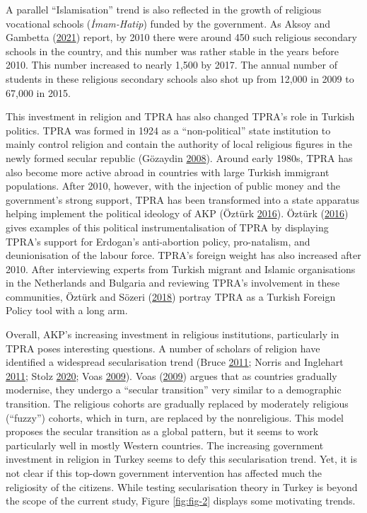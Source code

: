 \documentclass[
  12pt,
]{article}
\begin{document}
A parallel ``Islamisation'' trend is also reflected in the growth of religious vocational schools (\emph{İmam-Hatip}) funded by the government. As Aksoy and Gambetta (\protect\hyperlink{ref-AG21}{2021}) report, by 2010 there were around 450 such religious secondary schools in the country, and this number was rather stable in the years before 2010. This number increased to nearly 1,500 by 2017. The annual number of students in these religious secondary schools also shot up from 12,000 in 2009 to 67,000 in 2015.

This investment in religion and TPRA has also changed TPRA's role in Turkish politics. TPRA was formed in 1924 as a ``non-political'' state institution to mainly control religion and contain the authority of local religious figures in the newly formed secular republic (Gözaydin \protect\hyperlink{ref-Guxf6zaydin2008}{2008}). Around early 1980s, TPRA has also become more active abroad in countries with large Turkish immigrant populations. After 2010, however, with the injection of public money and the government's strong support, TPRA has been transformed into a state apparatus helping implement the political ideology of AKP (Öztürk \protect\hyperlink{ref-Ozt16}{2016}). Öztürk (\protect\hyperlink{ref-Ozt16}{2016}) gives examples of this political instrumentalisation of TPRA by displaying TPRA's support for Erdogan's anti-abortion policy, pro-natalism, and deunionisation of the labour force. TPRA's foreign weight has also increased after 2010. After interviewing experts from Turkish migrant and Islamic organisations in the Netherlands and Bulgaria and reviewing TPRA's involvement in these communities, Öztürk and Sözeri (\protect\hyperlink{ref-uxf6ztuxfcrk_suxf6zeri_2018}{2018}) portray TPRA as a Turkish Foreign Policy tool with a long arm.

Overall, AKP's increasing investment in religious institutions, particularly in TPRA poses interesting questions. A number of scholars of religion have identified a widespread secularisation trend (Bruce \protect\hyperlink{ref-bruce2011sec}{2011}; Norris and Inglehart \protect\hyperlink{ref-norris2011sacred}{2011}; Stolz \protect\hyperlink{ref-Sto20}{2020}; Voas \protect\hyperlink{ref-voas2009rise}{2009}). Voas (\protect\hyperlink{ref-voas2009rise}{2009}) argues that as countries gradually modernise, they undergo a ``secular transition''
very similar to a demographic transition. The religious cohorts are gradually replaced by moderately religious (``fuzzy'') cohorts, which in turn, are replaced by the nonreligious. This model proposes the secular transition as a global pattern, but it seems to work particularly well in mostly Western countries. The increasing government investment in religion in Turkey seems to defy this secularisation trend. Yet, it is not clear if this top-down government intervention has affected much the religiosity of the citizens. While testing secularisation theory in Turkey is beyond the scope of the current study, Figure \ref{fig:fig-2} displays some motivating trends.
\end{document}
